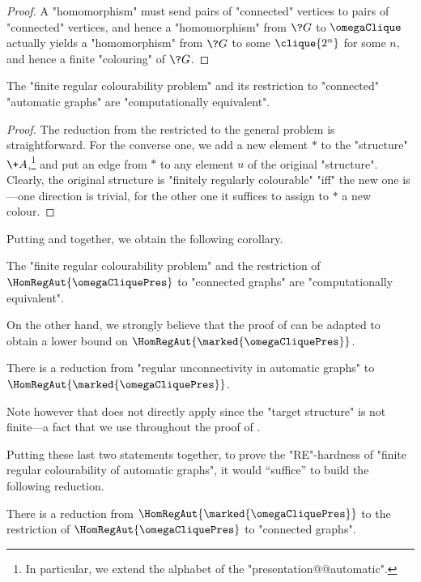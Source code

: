 \begin{proof}
	A "homomorphism" must send pairs of "connected" vertices to pairs of "connected" vertices,
	and hence a "homomorphism" from $\?G$ to $\omegaClique$ actually yields a "homomorphism"
	from $\?G$ to some $\clique{2^n}$ for some $n$, and hence a finite "colouring" of $\?G$.
\end{proof}

\begin{proposition}
	\AP\label{prop:finite-colourability-of-connected-graphs}
	The "finite regular colourability problem" and its restriction to "connected" "automatic graphs"
	are "computationally equivalent".
\end{proposition}

\begin{proof}
	The reduction from the restricted to the general problem is straightforward.
	For the converse one, we add a new element $*$ to the "structure" $\+A$,\footnote{In particular, we extend the alphabet of the "presentation@@automatic".} and put an edge
	from $*$ to any element $u$ of the original "structure". 
	Clearly, the original structure is "finitely regularly colourable" "iff" the new one is---one direction is trivial, for the other one it suffices to assign to $*$ a new colour.
\end{proof}

Putting  and  together, we obtain the following corollary.
\begin{corollary}
	The "finite regular colourability problem" and the restriction
	of $\HomRegAut{\omegaCliquePres}$ to "connected graphs" are "computationally equivalent".
\end{corollary}

On the other hand, we strongly believe that the proof of  can be adapted
to obtain a lower bound on $\HomRegAut{\marked{\omegaCliquePres}}$.
\begin{conjecture}
	There is a reduction from "regular unconnectivity in automatic graphs" to
	$\HomRegAut{\marked{\omegaCliquePres}}$.
\end{conjecture}
Note however that  does not directly apply since the "target structure"
is not finite---a fact that we use throughout the proof of .

Putting these last two statements together, to prove the "RE"-hardness of 
"finite regular colourability of automatic graphs", it would ``suffice'' to
build the following reduction.
\begin{conjecture}
	There is a reduction from $\HomRegAut{\marked{\omegaCliquePres}}$
	to the restriction of $\HomRegAut{\omegaCliquePres}$ to "connected graphs".
\end{conjecture}

